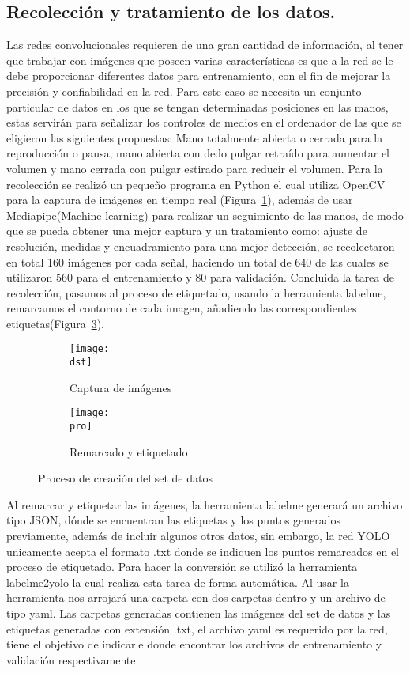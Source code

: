 \documentclass[a4paper, 12pt]{article}
\newcommand{\dst}{img/create_dst.png}
\newcommand{\pro}{img/label_procss.png}
\begin{document}
	\subsection{Recolección y tratamiento de los datos.}
	Las redes convolucionales requieren de una gran cantidad de información, al tener que trabajar con imágenes que poseen varias características es que a la red se le debe proporcionar diferentes datos para entrenamiento, con el fin de mejorar la precisión y confiabilidad en la red. Para este caso se necesita un conjunto particular de datos en los que se tengan determinadas posiciones en las manos, estas servirán para señalizar los controles de medios en el ordenador de las que se eligieron las siguientes propuestas: Mano totalmente abierta o cerrada para la reproducción o pausa, mano abierta con dedo pulgar retraído para aumentar el volumen y mano cerrada con pulgar estirado para reducir el volumen. Para la recolección se realizó un pequeño programa en Python el cual utiliza OpenCV para la captura de imágenes en tiempo real (Figura~\ref{sub:create_dataset}), además de usar Mediapipe(Machine learning) para realizar un seguimiento de las manos, de modo que se pueda obtener una mejor captura y un tratamiento como: ajuste de resolución, medidas y encuadramiento para una mejor detección, se recolectaron en total 160 imágenes por cada señal, haciendo un total de 640 de las cuales se utilizaron 560 para el entrenamiento y 80 para validación. Concluida la tarea de recolección, pasamos al proceso de etiquetado, usando la herramienta labelme, remarcamos el contorno de cada imagen, añadiendo las correspondientes etiquetas(Figura~\ref{sub:label_prcss}).

	\begin{figure}[H]
        \centering
		\begin{subfigure}{0.8\linewidth}
			\texttt{[image: \\dst]}
			\caption{Captura de imágenes}
			\label{sub:create_dataset}
		\end{subfigure}

        \begin{subfigure}{0.8\textwidth}
            \texttt{[image: \\pro]}
            \caption{Remarcado y etiquetado}
            \label{sub:label_prcss}
        \end{subfigure}
    \caption{Proceso de creación del set de datos}
	\end{figure}

	Al remarcar y etiquetar las imágenes, la herramienta labelme generará un archivo tipo JSON, dónde se encuentran las etiquetas y los puntos generados previamente, además de incluir algunos otros datos, sin embargo, la red YOLO unicamente acepta el formato .txt donde se indiquen los puntos remarcados en el proceso de etiquetado. Para hacer la conversión se utilizó la herramienta labelme2yolo la cual realiza esta tarea de forma automática. Al usar la herramienta nos arrojará una carpeta con dos carpetas dentro y un archivo de tipo yaml. Las carpetas generadas contienen las imágenes del set de datos y las etiquetas generadas con extensión .txt, el archivo yaml es requerido por la red, tiene el objetivo de indicarle donde encontrar los archivos de entrenamiento y validación respectivamente.
\end{document}

